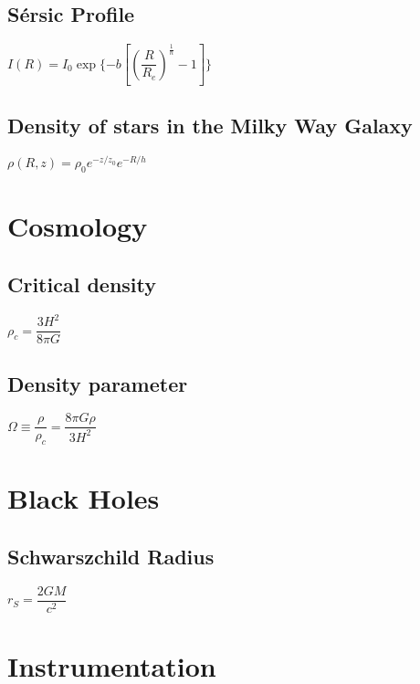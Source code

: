 \subsection{S\'ersic Profile}
\begin{itemize}
\itemt \( I(R) = I_0 \exp\{-b[\left(\dfrac{R}{R_e}\right)^\frac{1}{n}-1]\} \)
\end{itemize}

\subsection{Density of stars in the Milky Way Galaxy}
\begin{itemize}
\itemt \( \rho(R,z) = \rho_0 e^{-z/z_0} e^{-R/h} \)
\end{itemize}

\section{Cosmology}

\subsection{Critical density}

\begin{itemize}
    \itemt \( \rho_c = \dfrac{3H^2}{8\pi G} \)
\end{itemize}

\subsection{Density parameter}

\begin{itemize}
    \itemt \(\Omega \equiv \dfrac{\rho}{\rho_c} = \dfrac{8\pi G\rho}{3H^2}\)
\end{itemize}

\section{Black Holes}

\subsection{Schwarszchild Radius}		
\begin{itemize}
\itemt \( r_S = \dfrac{2GM}{c^2} \)
\end{itemize}

	\section{Instrumentation}

